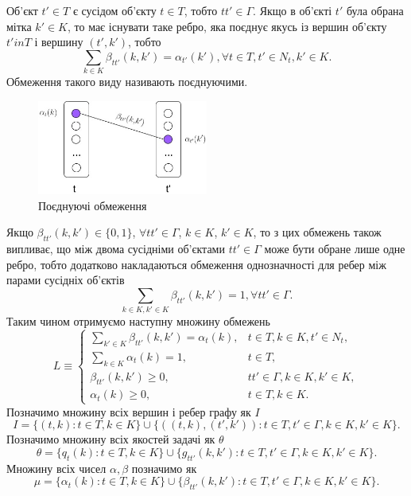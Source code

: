Об'єкт $t'\in T$ є сусідом об'єкту $t\in T$, тобто $tt'\in \Gamma$. Якщо 
в об'єкті $t'$ була обрана мітка $k'\in K$, то має існувати таке ребро, яка поєднує
якусь із вершин об'єкту $t'in T$ і вершину $(t',k')$, тобто
\begin{equation}
  \sum\limits_{k\in K}\beta_{tt'}(k,k')=\alpha_{t'}(k'), \forall t\in T, t'\in N_t, k'\in K.
\end{equation}
Обмеження такого виду називають поєднуючими. 
\begin{figure}[h]
  \centering
  \includegraphics[width=0.5\textwidth]{images/coupling_constr.jpg}
  \caption{Поєднуючі обмеження}
  \label{fig:coupling_constr}
\end{figure}

Якщо $\beta_{tt'}(k,k')\in \{0,1\}$, $\forall tt'\in\Gamma$, $k\in K$, $k'\in K$, 
то з цих обмежень також випливає, що між двома сусідніми об'єктами $tt'\in\Gamma$ може бути 
обране лише одне ребро, тобто додатково накладаються обмеження однозначності
для ребер між парами сусідніх об'єктів
\begin{equation}
  \sum\limits_{k \in K, k'\in K} \beta_{tt'}(k,k')=1, \forall tt'\in\Gamma.
\end{equation}
Таким чином отримуємо наступну множину обмежень
\begin{equation}
  L \equiv  
  \begin{cases}
    \sum\limits_{k' \in K} \beta_{tt'}(k,k') = \alpha_t(k), & t\in T, k\in K, t'\in N_t,\\
    \sum\limits_{k \in K} \alpha_t(k)=1, & t\in T,\\
    \beta_{tt'}(k,k')\geq 0, & tt'\in \Gamma, k\in K, k'\in K,\\
    \alpha_t(k)\geq 0, & t\in T, k\in K.
  \end{cases}
\end{equation} 
Позначимо множину всіх вершин і ребер графу як $I$
\begin{equation}
  I = \{(t,k):t\in T, k\in K\}\cup\{((t,k),(t',k')):t\in T, t'\in\Gamma, k\in K, k'\in K\}.
\end{equation}
Позначимо множину всіх якостей задачі як $\theta$
\begin{equation}
  \theta = \{q_t(k):t\in T, k\in K\}\cup\{g_{tt'}(k,k'):t\in T, t'\in\Gamma, k\in K, k'\in K\}.
\end{equation}
Множину всіх чисел $\alpha, \beta$ позначимо як
\begin{equation}
  \mu = \{\alpha_t(k):t\in T, k\in K\}\cup\{\beta_{tt'}(k,k'):t\in T, t'\in\Gamma, k\in K, k'\in K\}.
\end{equation}

